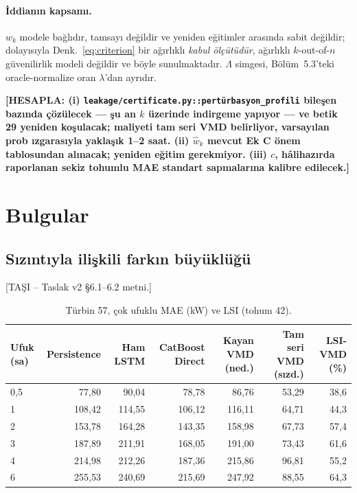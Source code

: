 \documentclass[11pt,a4paper]{article}
\newcommand{\hesapla}[1]{\textbf{[HESAPLA: #1]}}
\newcommand{\tasi}[1]{\textsf{\small [TAŞI -- #1]}}
\begin{document}
\paragraph{İddianın kapsamı.} $w_k$ modele bağlıdır, tamsayı değildir ve yeniden
eğitimler arasında sabit değildir; dolayısıyla Denk.~\eqref{eq:criterion} bir
ağırlıklı \emph{kabul ölçütüdür}, ağırlıklı $k$-out-of-$n$ güvenilirlik modeli
değildir ve böyle sunulmaktadır. $\Lambda$ simgesi, Bölüm~5.3'teki
oracle-normalize oran $\lambda$'dan ayrıdır.

\hesapla{(i) \texttt{leakage/certificate.py::pertürbasyon\_profili} bileşen
bazında çözülecek --- şu an $k$ üzerinde indirgeme yapıyor --- ve betik 29
yeniden koşulacak; maliyeti tam seri VMD belirliyor, varsayılan prob ızgarasıyla
yaklaşık 1--2 saat. (ii) $\hat w_k$ mevcut Ek C önem tablosundan alınacak;
yeniden eğitim gerekmiyor. (iii) $c$, hâlihazırda raporlanan sekiz tohumlu MAE
standart sapmalarına kalibre edilecek.}

\section{Bulgular}

\subsection{Sızıntıyla ilişkili farkın büyüklüğü}
\tasi{Taslak v2 §6.1--6.2 metni.}

\begin{table}[htbp]\centering
\caption{Türbin 57, çok ufuklu MAE (kW) ve LSI (tohum 42).}
\footnotesize
\begin{tabular}{lrrrrrr}
\toprule
Ufuk (sa) & Persistence & Ham LSTM & CatBoost Direct &
Kayan VMD (ned.) & Tam seri VMD (sızd.) & LSI-VMD (\%) \\
\midrule
0,5 &  77,80 &  90,04 &  78,78 &  86,76 & 53,29 & 38,6 \\
1   & 108,42 & 114,55 & 106,12 & 116,11 & 64,71 & 44,3 \\
2   & 153,78 & 164,28 & 143,35 & 158,98 & 67,73 & 57,4 \\
3   & 187,89 & 211,91 & 168,05 & 191,00 & 73,43 & 61,6 \\
4   & 214,98 & 212,26 & 187,36 & 215,86 & 96,81 & 55,2 \\
6   & 255,53 & 240,69 & 215,69 & 247,92 & 88,55 & 64,3 \\
\bottomrule
\end{tabular}
\end{table}
\end{document}
